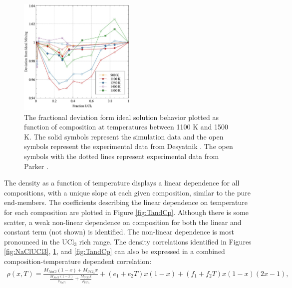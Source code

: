 \documentclass[preprint,3p,10pt,onecolumn,number,sort&compress]{elsarticle}
\begin{document}
{\begin{figure}[htb]
\centering
\includegraphics[width=0.5\textwidth]{fig8.jpg}
\caption{The fractional deviation form ideal solution behavior plotted as function of composition at temperatures between 1100 K and 1500 K. The solid symbols represent the simulation data and the open symbols represent the experimental data from Desyatnik \cite{Desyatnik}. The open symbols with the dotted lines represent experimental data from Parker \cite{Parker}.} 
\label{fig:ideal}
\end{figure}

The density as a function of temperature displays a linear dependence for all compositions, with a unique slope at each given composition, similar to the pure end-members. The coefficients describing the linear dependence on temperature for each composition are plotted in Figure \ref{fig:TandCp}. Although there is some scatter, a weak non-linear dependence on composition for both the linear and constant term (not shown) is identified. The non-linear dependence is most pronounced in the UCl$_3$ rich range. The density correlations identified in Figures \ref{fig:NaClUCl3}, \ref{fig:ideal}, and \ref{fig:TandCp} can also be expressed in a combined composition-temperature dependent correlation:
\begin{equation}
\begin{split}
\rho(x,T)=\frac{M_{NaCl}(1-x)+M_{UCl_3}x}{\frac{M_{NaCl}(1-x)}{\rho_{NaCl}}+\frac{M_{UCl3}x}{\rho_{UCl_3}}}+(e_1+e_2T)x(1-x)+(f_1+f_2T)x(1-x)(2x-1), 
\label{eq:LS}
\end{split}
\end{equation}

}
\end{document}
